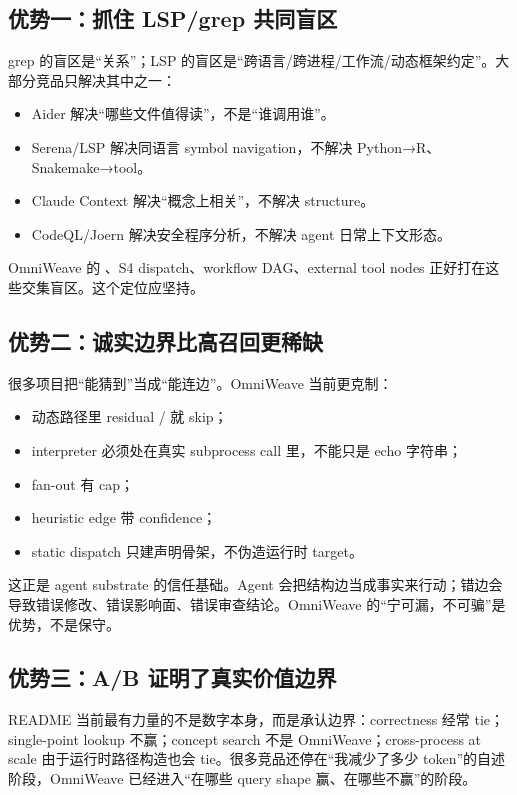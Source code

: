 \documentclass[11pt,a4paper]{article}
\newcommand{\code}[1]{\texttt{\detokenize{#1}}}
\begin{document}
\subsection{优势一：抓住 LSP/grep 共同盲区}

grep 的盲区是“关系”；LSP 的盲区是“跨语言/跨进程/工作流/动态框架约定”。大部分竞品只解决其中之一：

\begin{itemize}
  \item Aider 解决“哪些文件值得读”，不是“谁调用谁”。
  \item Serena/LSP 解决同语言 symbol navigation，不解决 Python→R、Snakemake→tool。
  \item Claude Context 解决“概念上相关”，不解决 structure。
  \item CodeQL/Joern 解决安全程序分析，不解决 agent 日常上下文形态。
\end{itemize}

OmniWeave 的 \code{crossLang}、S4 dispatch、workflow DAG、external tool nodes 正好打在这些交集盲区。这个定位应坚持。

\subsection{优势二：诚实边界比高召回更稀缺}

很多项目把“能猜到”当成“能连边”。OmniWeave 当前更克制：

\begin{itemize}
  \item 动态路径里 residual \code{\{...\}}/\code{\$} 就 skip；
  \item interpreter 必须处在真实 subprocess call 里，不能只是 echo 字符串；
  \item fan-out 有 cap；
  \item heuristic edge 带 confidence；
  \item static dispatch 只建声明骨架，不伪造运行时 target。
\end{itemize}

这正是 agent substrate 的信任基础。Agent 会把结构边当成事实来行动；错边会导致错误修改、错误影响面、错误审查结论。OmniWeave 的“宁可漏，不可骗”是优势，不是保守。

\subsection{优势三：A/B 证明了真实价值边界}

README 当前最有力量的不是数字本身，而是承认边界：correctness 经常 tie；single-point lookup 不赢；concept search 不是 OmniWeave；cross-process at scale 由于运行时路径构造也会 tie。很多竞品还停在“我减少了多少 token”的自述阶段，OmniWeave 已经进入“在哪些 query shape 赢、在哪些不赢”的阶段。
\end{document}
